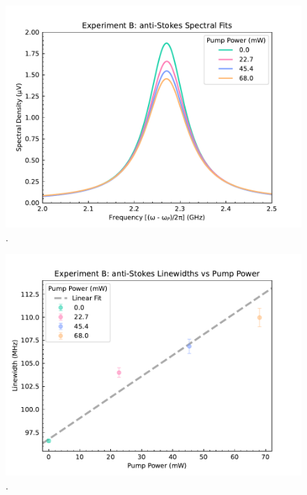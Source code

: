 \begin{figure}[t!]
  \centering
  \includegraphics[width=\textwidth]{figs/3-Cooling/P-P anti-Stokes Fits.pdf}
  \caption{.}
  \label{fig:Cooling:P-P anti-Stokes Fits}
\end{figure}

\begin{figure}[t!]
  \centering
  \includegraphics[width=\textwidth]{figs/3-Cooling/P-P anti-Stokes Wid v Pow.pdf}
  \caption{.}
  \label{fig:Cooling:P-P anti-Stokes Wid v Pow}
\end{figure}

